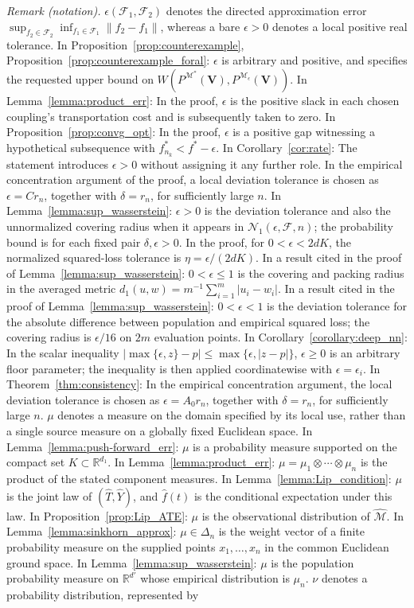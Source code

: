 \documentclass[12pt]{article}
\theoremstyle{plain}
\theoremstyle{definition}
\theoremstyle{remark}
\begin{document}
\noindent\textit{Remark (notation).} $\epsilon(\mathcal{F}_1,\mathcal{F}_2)$ denotes the directed approximation error $\sup_{f_2\in\mathcal{F}_2}\inf_{f_1\in\mathcal{F}_1}\|f_2-f_1\|$, whereas a bare $\epsilon>0$ denotes a local positive real tolerance. In Proposition~\ref{prop:counterexample}, Proposition~\ref{prop:counterexample_foral}: $\epsilon$ is arbitrary and positive, and specifies the requested upper bound on $W(P^{\mathcal{M}^*}(\boldsymbol{V}),P^{\mathcal{M}_\epsilon}(\boldsymbol{V}))$. In Lemma~\ref{lemma:product_err}: In the proof, $\epsilon$ is the positive slack in each chosen coupling's transportation cost and is subsequently taken to zero. In Proposition~\ref{prop:convg_opt}: In the proof, $\epsilon$ is a positive gap witnessing a hypothetical subsequence with $f_{n_k}^*<f^*-\epsilon$. In Corollary~\ref{cor:rate}: The statement introduces $\epsilon>0$ without assigning it any further role. In the empirical concentration argument of the proof, a local deviation tolerance is chosen as $\epsilon=Cr_n$, together with $\delta=r_n$, for sufficiently large $n$. In Lemma~\ref{lemma:sup_wasserstein}: $\epsilon>0$ is the deviation tolerance and also the unnormalized covering radius when it appears in $\mathcal{N}_1(\epsilon,\mathcal{F},n)$; the probability bound is for each fixed pair $\delta,\epsilon>0$. In the proof, for $0<\epsilon<2dK$, the normalized squared-loss tolerance is $\eta=\epsilon/(2dK)$. In a result cited in the proof of Lemma~\ref{lemma:sup_wasserstein}: $0<\epsilon\leqslant1$ is the covering and packing radius in the averaged metric $d_1(u,w)=m^{-1}\sum_{i=1}^m|u_i-w_i|$. In a result cited in the proof of Lemma~\ref{lemma:sup_wasserstein}: $0<\epsilon<1$ is the deviation tolerance for the absolute difference between population and empirical squared loss; the covering radius is $\epsilon/16$ on $2m$ evaluation points. In Corollary~\ref{corollary:deep_nn}: In the scalar inequality $|\max\{\epsilon,z\}-p|\leqslant\max\{\epsilon,|z-p|\}$, $\epsilon\geqslant0$ is an arbitrary floor parameter; the inequality is then applied coordinatewise with $\epsilon=\epsilon_i$. In Theorem~\ref{thm:consistency}: In the empirical concentration argument, the local deviation tolerance is chosen as $\epsilon=A_0r_n$, together with $\delta=r_n$, for sufficiently large $n$. $\mu$ denotes a measure on the domain specified by its local use, rather than a single source measure on a globally fixed Euclidean space. In Lemma~\ref{lemma:push-forward_err}: $\mu$ is a probability measure supported on the compact set $K\subset\mathbb{R}^{d_1}$. In Lemma~\ref{lemma:product_err}: $\mu=\mu_1\otimes\cdots\otimes\mu_n$ is the product of the stated component measures. In Lemma~\ref{lemma:Lip_condition}: $\mu$ is the joint law of $(\hat{T},\hat{Y})$, and $\hat{f}(t)$ is the conditional expectation under this law. In Proposition~\ref{prop:Lip_ATE}: $\mu$ is the observational distribution of $\hat{\mathcal{M}}$. In Lemma~\ref{lemma:sinkhorn_approx}: $\mu\in\Delta_n$ is the weight vector of a finite probability measure on the supplied points $x_1,\ldots,x_n$ in the common Euclidean ground space. In Lemma~\ref{lemma:sup_wasserstein}: $\mu$ is the population probability measure on $\mathbb{R}^{d'}$ whose empirical distribution is $\mu_n$. $\nu$ denotes a probability distribution, represented by 
\end{document}
